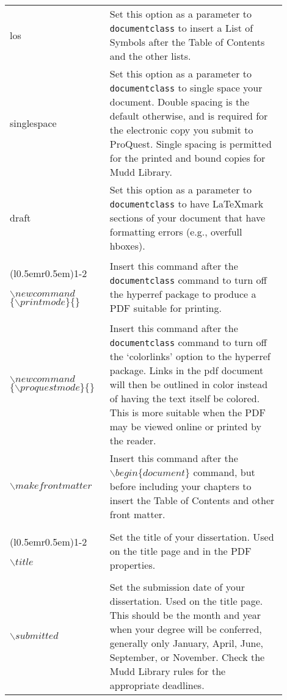 \begin{longtable}{p{0.3\linewidth} p{0.6\linewidth}}
  los &
  Set this option as a parameter to \texttt{documentclass} to insert a List of Symbols after the Table of Contents and the other lists.
  \\

  singlespace &
  Set this option as a parameter to \texttt{documentclass} to single space your document. Double spacing is the default otherwise, and is required for the electronic copy you submit to ProQuest. Single spacing is permitted for the printed and bound copies for Mudd Library.
  \\
  
  draft &
  Set this option as a parameter to \texttt{documentclass} to have \LaTeX mark sections of your document that have formatting errors (e.g., overfull hboxes). 
  \\

  \cmidrule[0.1pt](l{0.5em}r{0.5em}){1-2}

  \raggedright
  $\backslash newcommand$ $\{\backslash printmode\}\{\}$ &
  Insert this command after the \texttt{documentclass} command to turn off the hyperref package to produce a PDF suitable for printing.
  \\

  \raggedright
  $\backslash newcommand$ $\{\backslash proquestmode\}\{\}$  &
  Insert this command after the \texttt{documentclass} command to turn off the `colorlinks' option to the hyperref package. Links in the pdf document will then be outlined in color instead of having the text itself be colored. This is more suitable when the PDF may be viewed online or printed by the reader.
  \\

  $\backslash makefrontmatter$ &
  Insert this command after the \texttt{$\backslash begin\{document\}$} command, but before including your chapters to insert the Table of Contents and other front matter.
  \\
  
  \cmidrule[0.1pt](l{0.5em}r{0.5em}){1-2}

  $\backslash title$ &
  Set the title of your dissertation. Used on the title page and in the PDF properties.
  \\

  $\backslash submitted$ &
  Set the submission date of your dissertation. Used on the title page. This should be the month and year when your degree will be conferred, generally only January, April, June, September, or November. Check the Mudd Library rules for the appropriate deadlines.
  \\


\end{longtable}
